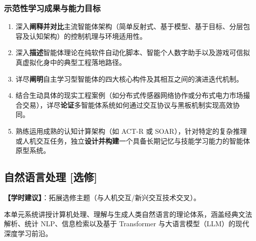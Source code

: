 \subsubsection{示范性学习成果与能力目标}
\begin{enumerate}
    \item 深入\textbf{阐释并对比}主流智能体架构（简单反射式、基于模型、基于目标、分层包容及认知架构）的控制机理与环境适用性。
    \item 深入\textbf{描述}智能体理论在纯软件自动化脚本、智能个人数字助手以及游戏可信拟真虚拟化身中的典型工程落地路径。
    \item 详尽\textbf{阐明}自主学习型智能体的四大核心构件及其相互之间的演进迭代机制。
    \item 结合生动具体的现实工程案例（如分布式传感器网络协作或分布式电力市场撮合交易），详尽\textbf{论证}多智能体系统如何通过交互协议与黑板机制实现高效协同。
    \item 熟练运用成熟的认知计算架构（如 ACT-R 或 SOAR），针对特定的复杂推理或人机交互任务，独立\textbf{设计并构建}一个具备长期记忆与技能学习能力的智能体原型系统。
\end{enumerate}

\subsection{自然语言处理 [选修]}
\textbf{【学时建议】}：拓展选修主题（与人机交互/新兴交互技术交叉）。

本单元系统讲授计算机处理、理解与生成人类自然语言的理论体系，涵盖经典文法解析、统计 NLP、信息检索以及基于 Transformer 与大语言模型（LLM）的现代深度学习前沿。

